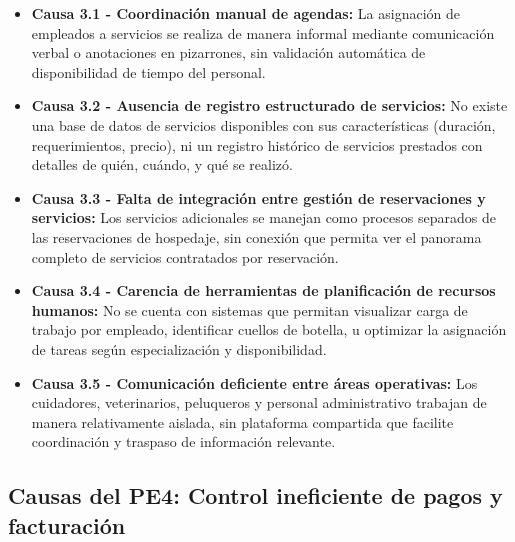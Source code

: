 	\begin{itemize}
		\item \textbf{Causa 3.1 - Coordinación manual de agendas:} La asignación de empleados a servicios se realiza de manera informal mediante comunicación verbal o anotaciones en pizarrones, sin validación automática de disponibilidad de tiempo del personal.
		
		\item \textbf{Causa 3.2 - Ausencia de registro estructurado de servicios:} No existe una base de datos de servicios disponibles con sus características (duración, requerimientos, precio), ni un registro histórico de servicios prestados con detalles de quién, cuándo, y qué se realizó.
		
		\item \textbf{Causa 3.3 - Falta de integración entre gestión de reservaciones y servicios:} Los servicios adicionales se manejan como procesos separados de las reservaciones de hospedaje, sin conexión que permita ver el panorama completo de servicios contratados por reservación.
		
		\item \textbf{Causa 3.4 - Carencia de herramientas de planificación de recursos humanos:} No se cuenta con sistemas que permitan visualizar carga de trabajo por empleado, identificar cuellos de botella, u optimizar la asignación de tareas según especialización y disponibilidad.
		
		\item \textbf{Causa 3.5 - Comunicación deficiente entre áreas operativas:} Los cuidadores, veterinarios, peluqueros y personal administrativo trabajan de manera relativamente aislada, sin plataforma compartida que facilite coordinación y traspaso de información relevante.
	\end{itemize}

\subsection{Causas del PE4: Control ineficiente de pagos y facturación}
\label{sec:causas4}

